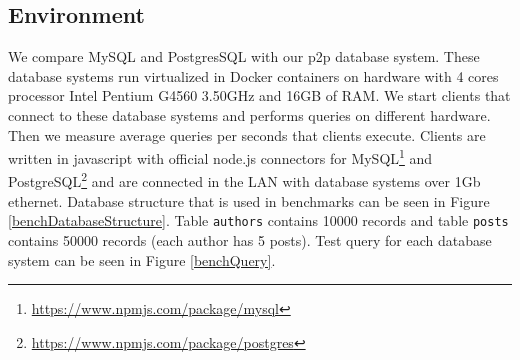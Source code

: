 \subsection{Environment}
We compare MySQL and PostgresSQL with our p2p database system. These database systems run virtualized in Docker containers on hardware with 4 cores processor Intel Pentium G4560 3.50GHz and 16GB of RAM.  We start clients that connect to these database systems and performs queries on different hardware. Then we measure average queries per seconds that clients execute. Clients are written in javascript with official node.js connectors for MySQL\footnote{\url{https://www.npmjs.com/package/mysql}} and PostgreSQL\footnote{\url{https://www.npmjs.com/package/postgres}} and are connected in the LAN with database systems over 1Gb ethernet. Database structure that is used in benchmarks can be seen in Figure \ref{benchDatabaseStructure}. Table \texttt{authors} contains 10000 records and table \texttt{posts} contains 50000 records (each author has 5 posts). Test query for each database system can be seen in Figure \ref{benchQuery}.

